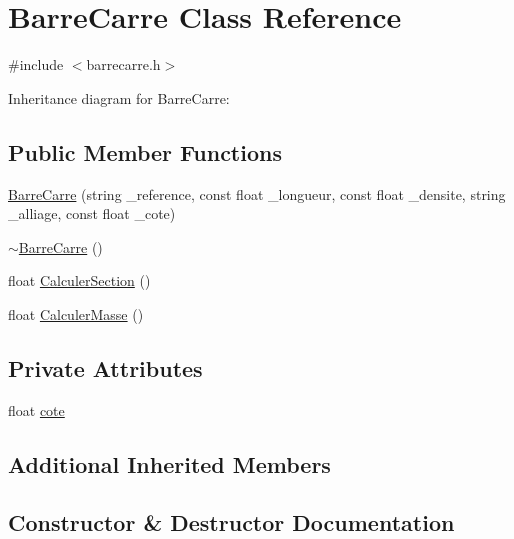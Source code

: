 \hypertarget{class_barre_carre}{}\section{Barre\+Carre Class Reference}
\label{class_barre_carre}


{\ttfamily \#include $<$barrecarre.\+h$>$}



Inheritance diagram for Barre\+Carre\+:
\subsection*{Public Member Functions}
\begin{DoxyCompactItemize}
\item 
\hyperlink{class_barre_carre_a2ba704f567c69db483610557df88cfbc}{Barre\+Carre} (string \+\_\+reference, const float \+\_\+longueur, const float \+\_\+densite, string \+\_\+alliage, const float \+\_\+cote)
\item 
\hyperlink{class_barre_carre_a82339da142c13e06c3e464612dce0a42}{$\sim$\+Barre\+Carre} ()
\item 
float \hyperlink{class_barre_carre_a521fa890549009143b4cd1fc0d20ba47}{Calculer\+Section} ()
\item 
float \hyperlink{class_barre_carre_ad290f96b7657082e3995c091a41a7a74}{Calculer\+Masse} ()
\end{DoxyCompactItemize}
\subsection*{Private Attributes}
\begin{DoxyCompactItemize}
\item 
float \hyperlink{class_barre_carre_aebae98f7422f75a54d1e0cf7ab0f9d72}{cote}
\end{DoxyCompactItemize}
\subsection*{Additional Inherited Members}


\subsection{Constructor \& Destructor Documentation}
\mbox{\label{class_barre_carre_a2ba704f567c69db483610557df88cfbc}} 
